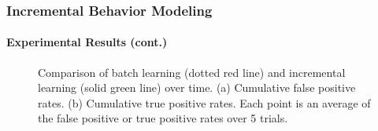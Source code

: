 \begin{frame}
    \frametitle{Incremental Behavior Modeling}
    \framesubtitle{Experimental Results (cont.)}

    \begin{figure}
        \centering
        \caption{Comparison of batch learning (dotted red line) and
            incremental learning (solid green line) over time.  (a) Cumulative
            false positive rates. (b) Cumulative true positive rates.  Each
            point is an average of the false positive or true positive rates
            over 5 trials.}
        \label{fig:chunking-results}
    \end{figure}

\end{frame}


